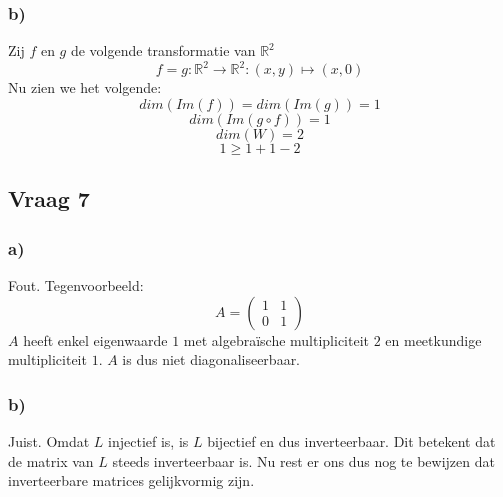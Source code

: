 \documentclass[lineaire_algebra_oplossingen.tex]{subfiles}
\begin{document}
\subsubsection*{b)}
Zij $f$ en $g$ de volgende transformatie van $\mathbb{R}^2$
\[
f = g : \mathbb{R}^2 \rightarrow \mathbb{R}^2: (x,y) \mapsto (x,0)
\]
Nu zien we het volgende:
\[
dim(Im(f)) = dim(Im(g)) = 1
\]
\[
dim(Im(g\circ f)) = 1
\]
\[
dim(W) = 2
\]
\[
1 \ge 1 + 1 - 2
\]

\subsection{Vraag 7}
\subsubsection*{a)}
Fout. Tegenvoorbeeld:\\
\[
A = 
\begin{pmatrix}
1 & 1\\
0 & 1
\end{pmatrix}
\]
$A$ heeft enkel eigenwaarde $1$ met algebraïsche multipliciteit $2$ en meetkundige multipliciteit $1$. $A$ is dus niet diagonaliseerbaar.

\subsubsection*{b)}
Juist.
Omdat $L$ injectief is, is  $L$ bijectief en dus inverteerbaar. Dit betekent dat de matrix van $L$ steeds inverteerbaar is. Nu rest er ons dus nog te bewijzen dat inverteerbare matrices gelijkvormig zijn.
\end{document}
